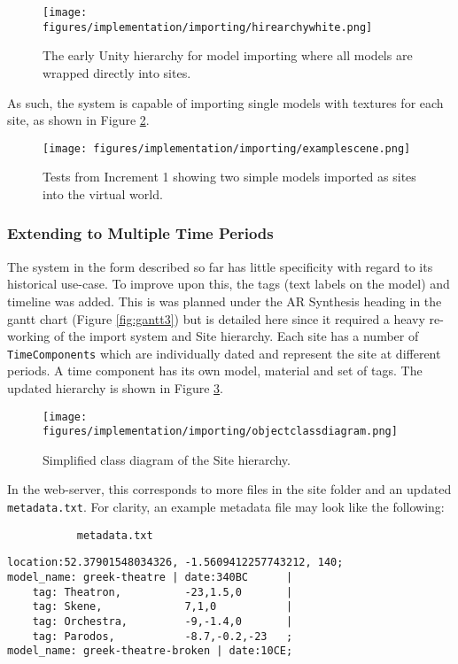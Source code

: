 \documentclass{article}
\begin{document}
\begin{figure}[h]
    \centering
    \texttt{[image: figures/implementation/importing/hirearchywhite.png]}
        \caption{The early Unity hierarchy for model importing where all models are wrapped directly into sites.}
        \label{fig:initialhirearchy}
\end{figure}

As such, the system is capable of importing single models with textures for each site, as shown in Figure \ref{fig:earlyimportedscene}.

\begin{figure}[h]
    \centering
    \texttt{[image: figures/implementation/importing/examplescene.png]}
        \caption{Tests from Increment 1 showing two simple models imported as sites into the virtual world.}
        \label{fig:earlyimportedscene}
\end{figure}

\subsubsection{Extending to Multiple Time Periods}
The system in the form described so far has little specificity with regard to its historical use-case. To improve upon this, the tags (text labels on the model) and timeline was added. This is was planned under the AR Synthesis heading in the gantt chart (Figure \ref{fig:gantt3}) but is detailed here since it required a heavy re-working of the import system and Site hierarchy. Each site has a number of \verb|TimeComponents| which are individually dated and represent the site at different periods. A time component has its own model, material and set of tags. The updated hierarchy is shown in Figure \ref{fig:hierarchydiagram}.

\begin{figure}[h]
    \centering
    \texttt{[image: figures/implementation/importing/objectclassdiagram.png]}
        \caption{Simplified class diagram of the Site hierarchy.}
        \label{fig:hierarchydiagram}
\end{figure}

In the web-server, this corresponds to more files in the site folder and an updated \verb|metadata.txt|. For clarity, an example metadata file may look like the following: 
\par
\verb|           metadata.txt|
\begin{mdframed}[leftmargin=50pt, rightmargin=50pt]
    \begin{verbatim}
location:52.37901548034326, -1.5609412257743212, 140;
model_name: greek-theatre | date:340BC      |
    tag: Theatron,          -23,1.5,0       |
    tag: Skene,             7,1,0           | 
    tag: Orchestra,         -9,-1.4,0       | 
    tag: Parodos,           -8.7,-0.2,-23   ;
model_name: greek-theatre-broken | date:10CE;\end{verbatim}
\end{mdframed}
\end{document}
